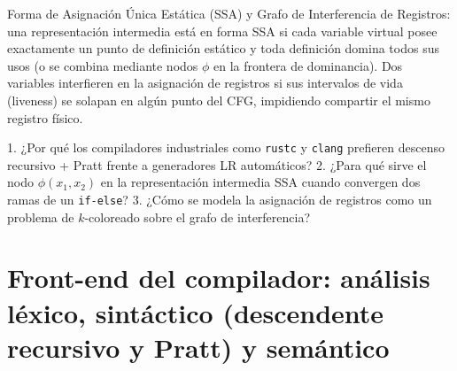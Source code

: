 \documentclass{book}
\begin{document}
\begin{tcolorbox}[title={Definición}, studiumdef, breakable]

Forma de Asignación Única Estática (SSA) y Grafo de Interferencia de Registros: una representación intermedia está en forma SSA si cada variable virtual posee exactamente un punto de definición estático y toda definición domina todos sus usos (o se combina mediante nodos \(\phi\) en la frontera de dominancia). Dos variables interfieren en la asignación de registros si sus intervalos de vida (liveness) se solapan en algún punto del CFG, impidiendo compartir el mismo registro físico.
\end{tcolorbox}

\begin{tcolorbox}[title={Autoficha}, studiumcheck, breakable]

1. ¿Por qué los compiladores industriales como \texttt{rustc} y \texttt{clang} prefieren descenso recursivo + Pratt frente a generadores LR automáticos? 2. ¿Para qué sirve el nodo \(\phi(x_1, x_2)\) en la representación intermedia SSA cuando convergen dos ramas de un \texttt{if-else}? 3. ¿Cómo se modela la asignación de registros como un problema de \(k\)-coloreado sobre el grafo de interferencia?
\end{tcolorbox}

\section{Front-end del compilador: análisis léxico, sintáctico (descendente recursivo y Pratt) y semántico}
\end{document}
